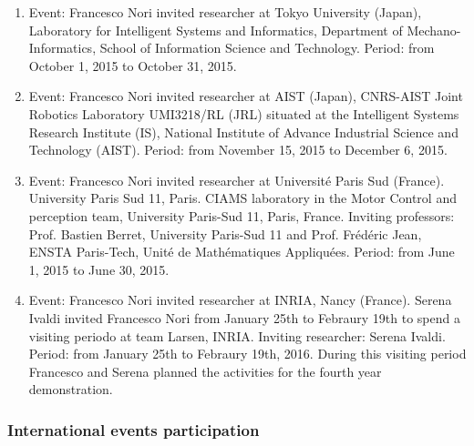 \begin{enumerate}

\item  Event: Francesco Nori invited researcher at Tokyo University (Japan), Laboratory for Intelligent Systems and Informatics, Department of Mechano-Informatics, School of Information Science and Technology. Period: from October 1, 2015 to October 31, 2015.

\item  Event: Francesco Nori invited researcher at AIST (Japan), CNRS-AIST Joint Robotics Laboratory UMI3218/RL (JRL) situated at the Intelligent Systems Research Institute (IS), National Institute of Advance Industrial Science and Technology (AIST). Period: from November 15, 2015 to December 6, 2015.

\item  Event: Francesco Nori invited researcher at Université Paris Sud (France). University Paris Sud 11, Paris. CIAMS laboratory in the Motor Control and perception team, University Paris-Sud 11, Paris, France. Inviting professors: Prof. Bastien Berret, University Paris-Sud 11 and Prof. Fr\'ed\'eric Jean, ENSTA Paris-Tech, Unit\'e de Math\'ematiques Appliqu\'ees. Period: from June 1, 2015 to June 30, 2015.

\item  Event: Francesco Nori invited researcher at INRIA, Nancy (France). Serena Ivaldi invited Francesco Nori from January 25th to Febraury 19th to spend a visiting periodo at team Larsen, INRIA. Inviting researcher: Serena Ivaldi. Period: from January 25th to Febraury 19th, 2016. During this visiting period Francesco and Serena planned the activities for the fourth year demonstration.
\end{enumerate}

\subsubsection{International events participation}

